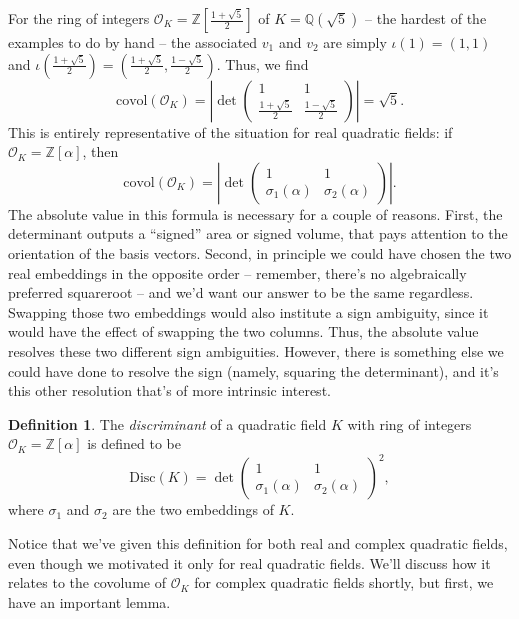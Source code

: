 \documentclass[12pt]{amsart}
\theoremstyle{definition} \newtheorem*{notation}{Notation}
\theoremstyle{remark} \newtheorem*{remark}{Remark}
\theoremstyle{remark} \newtheorem*{example}{Example}
\theoremstyle{definition} \newtheorem*{definition}{Definition}
\numberwithin{equation}{section}
\numberwithin{theorem}{section}
\begin{document}
	For the ring of integers $\mathcal{O}_K = \mathbb{Z}[\frac{1+\sqrt{5}}{2}]$ of $K = \mathbb{Q}(\sqrt{5})$ -- the hardest of the examples to do by hand -- the associated $v_1$ and $v_2$ are simply $\iota(1)=(1,1)$ and $\iota\left(\frac{1+\sqrt{5}}{2}\right) = (\frac{1+\sqrt{5}}{2}, \frac{1-\sqrt{5}}{2})$.  Thus, we find
		\[
			\mathrm{covol}( \mathcal{O}_K)
				= \left| \det \begin{pmatrix}
					1 & 1 \\
					\frac{1+\sqrt{5}}{2} & \frac{1-\sqrt{5}}{2} \end{pmatrix} \right|
				= \sqrt{5}.
		\]
	This is entirely representative of the situation for real quadratic fields: if $\mathcal{O}_K = \mathbb{Z}[\alpha]$, then
		\[
			\mathrm{covol}(\mathcal{O}_K)
				= \left| \det \begin{pmatrix} 1 & 1 \\ \sigma_1(\alpha) & \sigma_2(\alpha) \end{pmatrix} \right|.
		\]
	The absolute value in this formula is necessary for a couple of reasons.  First, the determinant outputs a ``signed'' area or signed volume, that pays attention to the orientation of the basis vectors.  Second, in principle we could have chosen the two real embeddings in the opposite order -- remember, there's no algebraically preferred squareroot -- and we'd want our answer to be the same regardless.  Swapping those two embeddings would also institute a sign ambiguity, since it would have the effect of swapping the two columns.  Thus, the absolute value resolves these two different sign ambiguities.  However, there is something else we could have done to resolve the sign (namely, squaring the determinant), and it's this other resolution that's of more intrinsic interest.
	
	\begin{definition}
		The \emph{discriminant} of a quadratic field $K$ with ring of integers $\mathcal{O}_K = \mathbb{Z}[\alpha]$ is defined to be
			\[
				\mathrm{Disc}(K)
					= \det\begin{pmatrix} 1 & 1 \\ \sigma_1(\alpha) & \sigma_2(\alpha) \end{pmatrix}^2,
			\]
		where $\sigma_1$ and $\sigma_2$ are the two embeddings of $K$.
	\end{definition}
	
	Notice that we've given this definition for both real and complex quadratic fields, even though we motivated it only for real quadratic fields.  We'll discuss how it relates to the covolume of $\mathcal{O}_K$ for complex quadratic fields shortly, but first, we have an important lemma.
	
\end{document}
